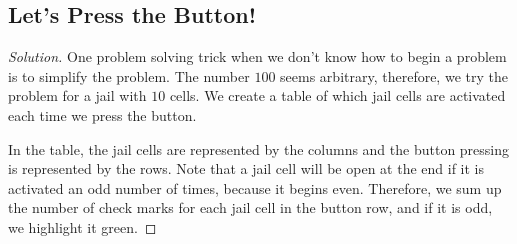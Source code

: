 \subsection*{Let's Press the Button!}
\begin{proof}[Solution]
One problem solving trick when we don't know how to begin a problem is to simplify the problem. The number $100$ seems arbitrary, therefore, we try the problem for a jail with $10$ cells. We create a table of which jail cells are activated each time we press the button.

In the table, the jail cells are represented by the columns and the button pressing is represented by the rows. Note that a jail cell will be open at the end if it is activated an odd number of times, because it begins even. Therefore, we sum up the number of check marks for each jail cell in the button row, and if it is odd, we highlight it green.

\clearpage

\begin{table}[h]
	\centering %
\end{table}


\end{proof}
